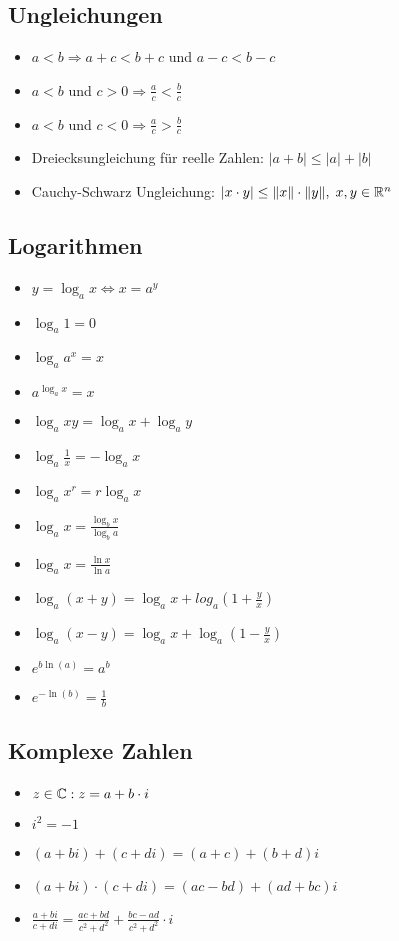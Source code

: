 \subsection{Ungleichungen}
\begin{itemize}[leftmargin=*]
  \item $a < b \Rightarrow a + c < b + c$ und $a - c < b - c$
  \item $a < b$ und $c > 0 \Rightarrow \frac{a}{c} < \frac{b}{c}$
  \item $a < b$ und $c < 0 \Rightarrow \frac{a}{c} > \frac{b}{c}$ 
  \item Dreiecksungleichung für reelle Zahlen: $|a+b| \le |a|{+}|b|$ %
  \item Cauchy-Schwarz Ungleichung: $|x \cdot y| \leq \|x\| \cdot \|y\|, \; x,y \in \mathbb{R}^n$
\end{itemize}

\subsection{Logarithmen}
\begin{itemize}[leftmargin=*]
  \item $y = \log_a x \Leftrightarrow x = a^y$
  \item $\log_a 1 = 0$
  \item $\log_a a^x = x$
  \item $a^{\log_a x} = x $
  \item $\log_a xy = \log_a x + \log_a y$
  \item $\log_a \frac{1}{x} = - \log_a x$
  \item $\log_a x^r = r \log_a x$
  \item $\log_a x = \frac{\log_b x}{\log_b a}$
  \item $\log_a x = \frac{\ln x}{\ln a}$
  \item $\log_a (x+y) = \log_a x + log_a (1 + \frac{y}{x})$
  \item $\log_a (x-y) = \log_a x + \log_a (1- \frac{y}{x})$
  \item $e^{b \ln(a)} = a^b$
  \item $ e^{-\ln(b)} = \frac{1}{b}$
\end{itemize}

\subsection{Komplexe Zahlen}
\begin{itemize}[leftmargin=*]
	\item $z \in \mathbb{C}: z = a + b\cdot i$
	\item $i^2 = -1$
	\item $(a + bi) + (c + di) = (a + c) + (b + d)i$
	\item $(a + bi) \cdot (c + di) = (ac - bd) + (ad + bc)i$
	\item $\frac{a + bi}{c + di} = \frac{ac + bd}{c^2 + d^2} + \frac{bc - ad}{c^2 + d^2}\cdot i$
\end{itemize}

